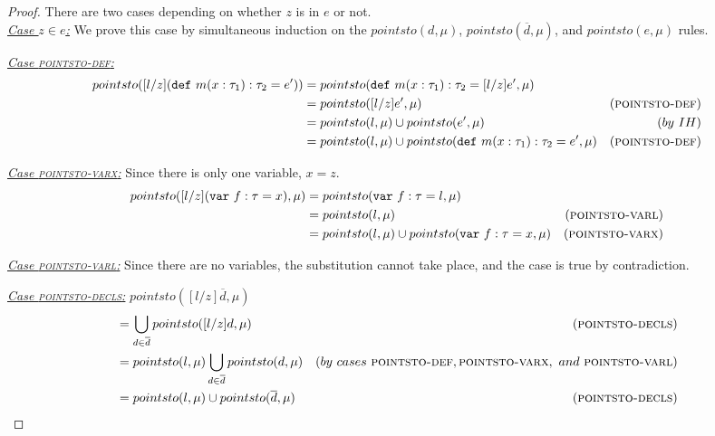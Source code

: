 \documentclass{llncs}
\newcommand{\keywadj}[1]{\mathtt{#1}}
\newcommand{\keyw}[1]{\keywadj{#1}~}
\begin{document}
\begin{proof} There are two cases depending on whether $z$ is in $e$ or not.\\

\noindent\underline{\underline{\textit{Case $z \in e$:}}} We prove this case by simultaneous induction on the $pointsto(d, \mu)$, $pointsto(\overline{d}, \mu)$, and $pointsto(e, \mu)$ rules.

\noindent\underline{\textit{Case \textsc{pointsto-def}:}}
\vspace{-7pt}
\begin{align*}
pointsto([l / z](\keyw{def} m(x : \tau_1) : \tau_2 = e')) &= pointsto(\keyw{def} m(x : \tau_1) : \tau_2 = [l / z]e', \mu)\\
&= pointsto([l / z]e', \mu) & (\textsc{pointsto-def})\\
&= pointsto(l, \mu) \cup pointsto(e', \mu) & (by~IH)\\
&= pointsto(l, \mu) \cup pointsto(\keyw{def} m(x : \tau_1) : \tau_2 = e', \mu) & (\textsc{pointsto-def})
\end{align*}

\noindent\underline{\textit{Case \textsc{pointsto-varx}:}} Since there is only one variable, $x = z$.
\vspace{-7pt}
\begin{align*}
pointsto([l / z](\keyw{var} f : \tau = x), \mu) &= pointsto(\keyw{var} f : \tau = l, \mu)\\
&= pointsto(l, \mu) & (\textsc{pointsto-varl})\\
&= pointsto(l, \mu) \cup pointsto(\keyw{var} f : \tau = x, \mu) & (\textsc{pointsto-varx})
\end{align*}

\noindent\underline{\textit{Case \textsc{pointsto-varl}:}} Since there are no variables, the substitution cannot take place, and the case is true by contradiction.

\noindent\underline{\textit{Case \textsc{pointsto-decls}:}} $pointsto([l / z]\overline{d}, \mu)$
\vspace{-7pt}
\begin{align*}
&= \bigcup_{d \in \overline{d}} pointsto([l / z]d, \mu) & (\textsc{pointsto-decls})\\
&= pointsto(l, \mu) \bigcup_{d \in \overline{d}} pointsto(d, \mu) & (by~cases~\textsc{pointsto-def}, \textsc{pointsto-varx},~and~\textsc{pointsto-varl})\\
&= pointsto(l, \mu) \cup pointsto(\overline{d}, \mu) & (\textsc{pointsto-decls})
\end{align*}


\end{proof}
\end{document}
